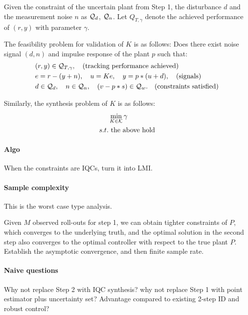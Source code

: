 \documentclass[11pt, onecolumn]{article}
\begin{document}
Given the constraint of the uncertain plant from Step 1, the disturbance $d$ and the measurement
noise $n$ as $\mathcal Q_d$, $\mathcal Q_n$. Let $Q_{T,\gamma}$ denote the achieved performance of $(r,y)$
with parameter $\gamma$.

The feasibility problem for validation of $K$ is as follows: Does there exist noise signal $(d, n)$
and impulse response of the plant $p$ such that:
\begin{align*}
  & (r,y)\in\mathcal Q_{T,\gamma}, \quad\text{(tracking performance achieved)}
  \\
  & e = r-(y+n), \quad u = K e, \quad y = p * (u+d),  \quad\text{(signals)}
  \\
  & d\in\mathcal Q_d, \quad n\in\mathcal Q_n,  \quad (v-p*s )\in\mathcal Q_w. \quad\text{(constraints satisfied)}
\end{align*}

Similarly, the synthesis problem of $K$ is as follows:
\begin{align*}
  &\min_{K\in\mathcal K} \gamma
  \\
  s.t.& \text{ the above hold}
\end{align*}


\paragraph{Algo}
When the constraints are IQCs, turn it into LMI.

\paragraph{Sample complexity}
This is the worst case type analysis.

Given $M$ observed roll-outs for step 1, we can obtain tighter constraints of $P$, which converges
to the underlying truth, and the optimal solution in the second step also converges to the optimal
controller with respect to the true plant $P$. Establish the asymptotic convergence, and then finite
sample rate.



\paragraph{Naive questions}
Why not replace Step 2 with IQC synthesis? why not replace Step 1 with point estimator plus
uncertainty set? Advantage compared to existing 2-step ID and robust control?

\newpage
\end{document}
